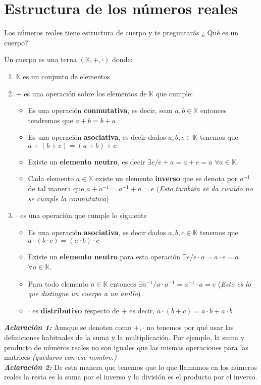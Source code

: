 \section{Estructura de los números reales}
Los números reales tiene estructura de cuerpo y te preguntarás ¿ Qué es un cuerpo?
\begin{defi}
Un cuerpo es una terna $(\mathbb{K},+,\cdot)$ donde:
\begin{enumerate}
\item $\mathbb{K}$ es un conjunto de elementos 
\item $+$ es una operación sobre los elementos de $\mathbb{K}$ que cumple:
\begin{itemize}
\item Es una operación \textbf{conmutativa}, es decir, sean $a,b\in \mathbb{K}$ entonces tendremos que $a+b=b+a$
\item Es una operación \textbf{asociativa}, es decir dados $a,b,c \in \mathbb{K}$ tenemos que $a+(b+c)=(a+b)+c$
\item Existe un \textbf{elemento neutro}, es decir $\exists e / e+a=a+e=a$ $\forall a \in \mathbb{K}$.
\item Cada elemento $a \in \mathbb{K} $ existe un elemento \textbf{inverso} que se denota por $a^{-1} $ de tal manera que $a+a^{-1}=a^{-1}+a=e$ (\emph{Esto también se da cuando no se cumple la conmutativa})
\end{itemize}

\item $\cdot$ es una operación que cumple lo siguiente 
\begin{itemize}

\item Es una operación \textbf{asociativa}, es decir dados $a,b,c \in \mathbb{K}$ tenemos que $a\cdot(b\cdot c)=(a\cdot b)\cdot c$

\item Existe un \textbf{elemento neutro} para esta operación  $\exists e / e\cdot a=a \cdot e=a$ $\forall a \in \mathbb{K}$.

\item Para todo elemento $a \in \mathbb{K}$ entonces $\exists a^{-1} /  a \cdot a^{-1}=a^{-1}\cdot a=e $ (\emph{Esto es lo que distingue un cuerpo a un anillo})

\item $\cdot$ es \textbf{distributivo} respecto de $+$ es decir, $a\cdot (b+c)=a \cdot b + a \cdot b$

\end{itemize}
\end{enumerate}

  
\end{defi}
\noindent
\textbf{\emph{Aclaración 1: }} Aunque se denoten como $+, \cdot$ no tenemos por qué usar las definiciones habituales de la suma y la multiplicación. Por ejemplo, la suma y producto de números reales no son iguales que las mismas operaciones para las matrices \emph{(quedaros con ese nombre.) } \\
\textbf{\emph{Aclaración 2: }}  De esta manera que tenemos que lo que llamamos en los números reales la resta es la suma por el inverso y la división es el producto por el inverso.

